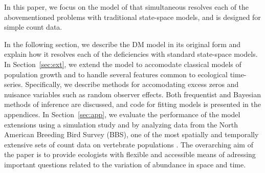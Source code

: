 \documentclass[12pt]{article}
\begin{document}
In this paper, we focus on the model of
\citet[henceforth the DM model;]{dail_madsen:2011}
that simultaneous resolves each of the abovementioned problems with
traditional state-space models, and is designed for simple count
data.

In the following section, we describe the DM model in its original
form and explain how it resolves each of the deficiencies with
standard state-space models. In Section~\ref{sec:ext}, we extend the
model to accomodate classical models of population growth and to
handle several features common to ecological
time-series. Specifically, we describe methods for accomodating excess
zeros and nuisance variables such as random observer effects. Both
frequentist and Bayesian methods of inference are discussed, and code
for fitting models is presented in the appendices.
In Section~\ref{sec:app}, we evaluate the performance of the model
extensions using a simulation study and by analyzing data from the
North American Breeding Bird Survey (BBS), one of
the most spatially and temporally extensive sets of count data on
vertebrate populations \citep{robbins_etal:1986}. The overarching aim
of  the paper is to provide ecologists with flexible and accessible means of
adressing important questions related to the variation of abundance in
space and time.
\end{document}
